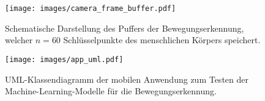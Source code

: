 \begin{figure}
    \texttt{[image: images/camera\_frame\_buffer.pdf]}
    \caption{Schematische Darstellung des Puffers der Bewegungserkennung,
    welcher $n = 60$ Schlüsselpunkte des menschlichen Körpers speichert.}
    \label{fig:camera-frame-buffer}
\end{figure}

\begin{figure}
    \texttt{[image: images/app\_uml.pdf]}
    \caption{UML-Klassendiagramm der mobilen Anwendung zum Testen der
    Machine-Learning-Modelle für die Bewegungserkennung.}
    \label{fig:uml-app}
\end{figure}

